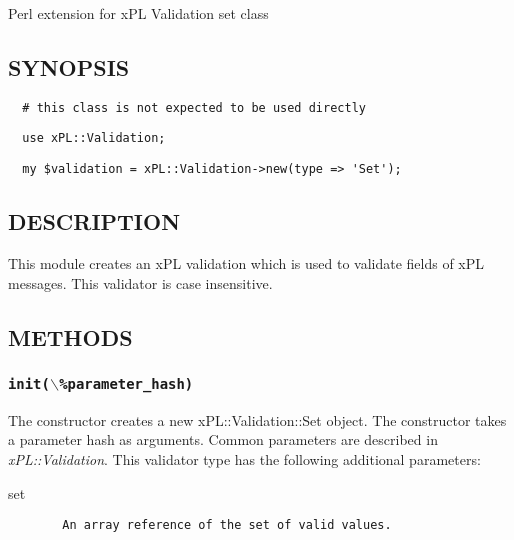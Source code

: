 Perl extension for xPL Validation set class

\subsection*{SYNOPSIS\label{xPL::Validation::Set_SYNOPSIS}}
\begin{verbatim}
  # this class is not expected to be used directly
\end{verbatim}
\begin{verbatim}
  use xPL::Validation;
\end{verbatim}
\begin{verbatim}
  my $validation = xPL::Validation->new(type => 'Set');
\end{verbatim}
\subsection*{DESCRIPTION\label{xPL::Validation::Set_DESCRIPTION}}


This module creates an xPL validation which is used to validate fields
of xPL messages.  This validator is case insensitive.

\subsection*{METHODS\label{xPL::Validation::Set_METHODS}}
\subsubsection*{\texttt{init($\backslash$\%parameter\_hash)}\label{xPL::Validation::Set_init_backslash_parameter_hash_}}


The constructor creates a new xPL::Validation::Set object.
The constructor takes a parameter hash as arguments.  Common
parameters are described in \emph{xPL::Validation}.  This validator type
has the following additional parameters:

\begin{description}

\item[{set}] \mbox{}\begin{verbatim}
  An array reference of the set of valid values.
\end{verbatim}
\end{description}


